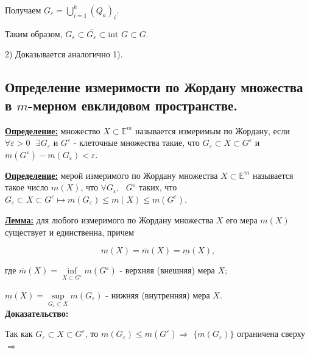\documentclass[a4paper,12pt]{article} %
\begin{document}
Получаем $G_{\varepsilon} = \bigcup\limits_{i = 1}^k (Q_a)_i$.

Таким образом, $G_{\varepsilon} \subset \overline{G_{\varepsilon}} \subset \text{int } G \subset G$.

\vspace{3mm}
2) Доказывается аналогично 1).\\


\subsection{Определение измеримости по Жордану множества в $m$-мерном евклидовом пространстве.}

\underline{\textbf{Определение:}} множество $X \subset \mathbb{E}^m$ называется измеримым по Жордану, если $\forall \varepsilon > 0 \text{ }\exists G_{\varepsilon}$ и $G^{\varepsilon}$ - клеточные множества такие, что $G_{\varepsilon} \subset X \subset G^{\varepsilon}$ и $m(G^{\varepsilon}) - m(G_{\varepsilon}) < \varepsilon$. 

\vspace{3mm}

\underline{\textbf{Определение:}} мерой измеримого по Жордану множества $X \subset \mathbb{E}^m$ называется такое число $m(X)$, что $\forall G_{\varepsilon},\text{ } G^{\varepsilon}$ таких, что $G_{\varepsilon} \subset X \subset G^{\varepsilon} \longmapsto m(G_{\varepsilon}) \leqslant m(X) \leqslant m(G^{\varepsilon})$.

\vspace{3mm}

\underline{\textbf{Лемма:}} для любого измеримого по Жордану множества $X$ его мера $m(X)$ существует и единственна, причем

\begin{equation*}
	m(X) = \overline{m}(X) = \underline{m}(X),
\end{equation*}

\noindent где $\overline{m}(X) = \inf\limits_{X \subset G^{\varepsilon}} m(G^{\varepsilon})$ - верхняя (внешняя) мера $X$;

\noindent $\underline{m}(X) = \sup\limits_{G_{\varepsilon} \subset X} m(G_{\varepsilon})$ - нижняя (внутренняя) мера $X$.\\

\textbf{Доказательство:} 

Так как $G_{\varepsilon} \subset X \subset G^{\varepsilon}$, то $m(G_{\varepsilon}) \leqslant m(G^{\varepsilon}) \Rightarrow$ $\{m(G_{\varepsilon})\}$ ограничена сверху $\Rightarrow$
\end{document}
